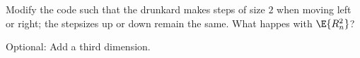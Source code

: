 \begin{exercise}
Modify the code such that the drunkard makes steps of size $2$ when moving left or right; the stepsizes up or down remain the same. What happes with $\E{R^{2}_n}$?
\end{exercise}

\begin{exercise}
Optional: Add a third dimension.
\end{exercise}



